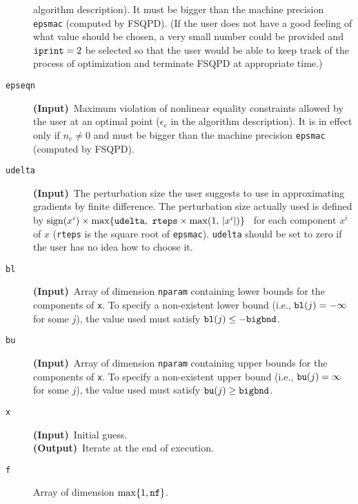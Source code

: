 \begin{description}
                  algorithm description). It must be bigger 
                  than the machine
                  precision {\tt epsmac} (computed by FSQPD).
                  (If the user does not have a good feeling of
                  what value should be chosen, a very small
                  number could be provided and $\mbox{\tt iprint}=2$
                  be selected so that the user would be able to keep track of 
                  the process of optimization and terminate FSQPD
                  at appropriate time.)
\item[\tt epseqn] {\bf (Input)}~Maximum violation of nonlinear equality
                  constraints allowed by the user at an optimal point
                  ($\epsilon_e$ in the algorithm description). 
                  It is in effect only if $n_e\ne 0$ and
                  must be bigger than the machine
                  precision {\tt epsmac} (computed by FSQPD). 
\item[\tt udelta]  {\bf (Input)}~The perturbation  
                  size the user suggests to use in 
                  approximating gradients by finite difference.
                  The perturbation size actually used is defined by 
$\mbox{sign}(x^i)\times\max \{{\tt udelta},~
                  {\tt rteps}\times \max (1,\,|x^i|)\}$~
                  for each component $x^i$ of $x$ ({\tt rteps} 
                  is the square root of {\tt epsmac}). {\tt udelta}
                  should be set to zero if the user has no idea
                  how to choose it.
\item[\tt bl]     {\bf (Input)}~Array of 
                  dimension {\tt nparam} containing
                  lower bounds for the components of {\tt x}. 
                  To specify a non-existent lower 
                  bound (i.e., ${\tt bl}(j)=-\infty$ for 
                  some $j$), the value used must 
                  satisfy ${\tt bl}(j)\leq -{\tt bigbnd}$.
\item[\tt bu]     {\bf (Input)}~Array of 
                  dimension {\tt nparam} containing
                  upper bounds for the components of {\tt x}. 
                  To specify a non-existent upper 
                  bound (i.e., ${\tt bu}(j)=\infty$ for 
                  some $j$), the value used must 
                  satisfy ${\tt bu}(j)\geq {\tt bigbnd}$.
\item[\tt x]      {\bf (Input)}~Initial guess.\\
                  {\bf (Output)}~Iterate at the end of execution. 
\item[\tt f]      Array of dimension $\max\{1, {\tt nf}\}$.\\

\end{description}
